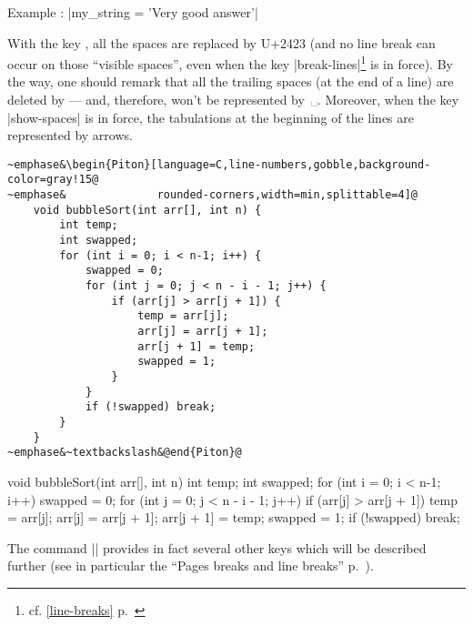 \documentclass{article}
\begin{document}
\begin{itemize}
\nobreak
\begingroup
{} Example : 
\piton|my_string = 'Very good answer'| \endgroup

With the key  , all the spaces are
replaced by U+2423 (and no line break can occur on those ``visible spaces'',
even when the key |break-lines|\footnote{cf. \ref{line-breaks}
p.~\pageref{line-breaks}} is in force). By the way, one should remark that all
the trailing spaces (at the end of a line) are deleted by  --- and,
therefore, won't be represented by~␣. Moreover, when the key |show-spaces| is
in force, the tabulations at the beginning of the lines are represented by arrows.
\end{itemize}

\bigskip
\begingroup
\small
{}
\begin{Verbatim}
~emphase&\begin{Piton}[language=C,line-numbers,gobble,background-color=gray!15@
~emphase&              rounded-corners,width=min,splittable=4]@
    void bubbleSort(int arr[], int n) {
        int temp;
        int swapped;
        for (int i = 0; i < n-1; i++) {
            swapped = 0;
            for (int j = 0; j < n - i - 1; j++) {
                if (arr[j] > arr[j + 1]) {
                    temp = arr[j];
                    arr[j] = arr[j + 1];
                    arr[j + 1] = temp;
                    swapped = 1; 
                }
            }
            if (!swapped) break;
        }
    }   
~emphase&~textbackslash&@end{Piton}@
\end{Verbatim}
\endgroup

\begingroup
{}
    \begin{Piton}
    void bubbleSort(int arr[], int n) {
        int temp;
        int swapped;
        for (int i = 0; i < n-1; i++) {
            swapped = 0;
            for (int j = 0; j < n - i - 1; j++) {
                if (arr[j] > arr[j + 1]) {
                    temp = arr[j];
                    arr[j] = arr[j + 1];
                    arr[j + 1] = temp;
                    swapped = 1; 
                }
            }
            if (!swapped) break;
        }
    }   
    \end{Piton}
\endgroup


\bigskip
The command |\PitonOptions| provides in fact several other keys which will be
described further (see in particular the ``Pages breaks and line breaks''
p.~\pageref{breakable}). 
\end{document}
